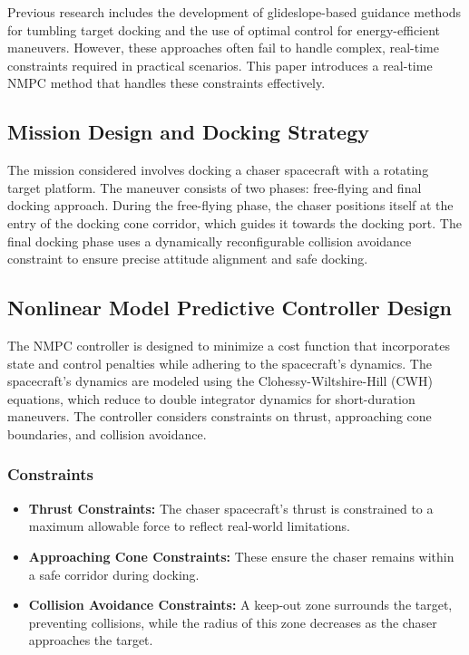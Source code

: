 \documentclass[a4paper,12pt]{article}
\begin{document}
        Previous research includes the development of glideslope-based guidance methods for tumbling target docking and the use of optimal control for energy-efficient maneuvers. However, these approaches often fail to handle complex, real-time constraints required in practical scenarios. This paper introduces a real-time NMPC method that handles these constraints effectively.
        
        \subsection{Mission Design and Docking Strategy}
        The mission considered involves docking a chaser spacecraft with a rotating target platform. The maneuver consists of two phases: free-flying and final docking approach. During the free-flying phase, the chaser positions itself at the entry of the docking cone corridor, which guides it towards the docking port. The final docking phase uses a dynamically reconfigurable collision avoidance constraint to ensure precise attitude alignment and safe docking.
        
        \subsection{Nonlinear Model Predictive Controller Design}
        The NMPC controller is designed to minimize a cost function that incorporates state and control penalties while adhering to the spacecraft's dynamics. The spacecraft's dynamics are modeled using the Clohessy-Wiltshire-Hill (CWH) equations, which reduce to double integrator dynamics for short-duration maneuvers. The controller considers constraints on thrust, approaching cone boundaries, and collision avoidance.
        
        \subsubsection{Constraints}
        \begin{itemize}
            \item \textbf{Thrust Constraints:} The chaser spacecraft's thrust is constrained to a maximum allowable force to reflect real-world limitations.
            \item \textbf{Approaching Cone Constraints:} These ensure the chaser remains within a safe corridor during docking.
            \item \textbf{Collision Avoidance Constraints:} A keep-out zone surrounds the target, preventing collisions, while the radius of this zone decreases as the chaser approaches the target.
        \end{itemize}
        
\end{document}
